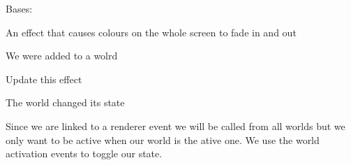 \documentclass[letterpaper,10pt,english]{sphinxmanual}
\begin{document}
\begin{fulllineitems}
\label{blocks:serge.blocks.effects.ColourPhaser}
Bases: {\hyperref[blocks:serge.blocks.effects.Effect]{}}

An effect that causes colours on the whole screen to fade in and out

\begin{fulllineitems}
\label{blocks:serge.blocks.effects.ColourPhaser.addedToWorld}
We were added to a wolrd

\end{fulllineitems}


\begin{fulllineitems}
\label{blocks:serge.blocks.effects.ColourPhaser.postRender}
Update this effect

\end{fulllineitems}


\begin{fulllineitems}
\label{blocks:serge.blocks.effects.ColourPhaser.worldChange}
The world changed its state

Since we are linked to a renderer event we will be called from all worlds
but we only want to be active when our world is the ative one. We use
the world activation events to toggle our state.

\end{fulllineitems}


\end{fulllineitems}

\end{document}
